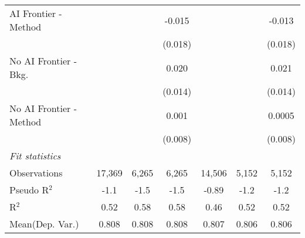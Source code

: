 \begin{tabular}{lcccccc}
   AI Frontier - Method    &               &              & -0.015        &               &              & -0.013\\   
                           &               &              & (0.018)       &               &              & (0.018)\\   
   No AI Frontier - Bkg.   &               &              & 0.020         &               &              & 0.021\\   
                           &               &              & (0.014)       &               &              & (0.014)\\   
   No AI Frontier - Method &               &              & 0.001         &               &              & 0.0005\\   
                           &               &              & (0.008)       &               &              & (0.008)\\   
   \midrule
   \emph{Fit statistics}\\
   Observations            & 17,369        & 6,265        & 6,265         & 14,506        & 5,152        & 5,152\\  
   Pseudo R$^2$            & -1.1          & -1.5         & -1.5          & -0.89         & -1.2         & -1.2\\  
   R$^2$                   & 0.52          & 0.58         & 0.58          & 0.46          & 0.52         & 0.52\\  
Mean(Dep. Var.) & 0.808 & 0.808 & 0.808 & 0.807 & 0.806 & 0.806 \\
   

\end{tabular}
